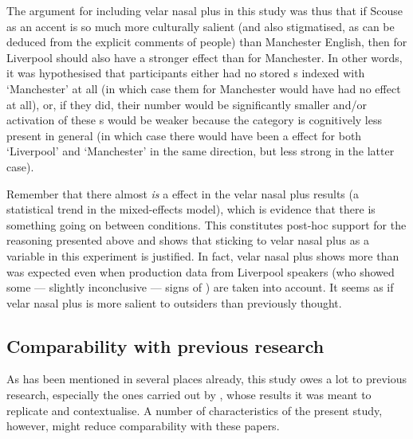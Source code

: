 The argument for including velar nasal plus in this study was thus that if Scouse as an accent is so much more culturally salient (and also stigmatised, as can be deduced from the explicit comments of people) than Manchester English, then  for Liverpool should also have a stronger effect than  for Manchester.
In other words, it was hypothesised that participants either had no stored s indexed with `Manchester' at all (in which case  them for Manchester would have had no effect at all), or, if they did, their number would be significantly smaller and/or activation of these s would be weaker because the category is cognitively less present in general (in which case there would have been a  effect for both `Liverpool' and `Manchester' in the same direction, but less strong in the latter case).

Remember that there almost \emph{is} a  effect in the velar nasal plus results (a statistical trend in the mixed-effects model), which is evidence that there is something going on between  conditions.
This constitutes post-hoc support for the reasoning presented above and shows that sticking to velar nasal plus as a variable in this experiment is justified.
In fact, velar nasal plus shows more  than was expected even when production data from Liverpool speakers (who showed some --- slightly inconclusive --- signs of ) are taken into account.
It seems as if velar nasal plus is more salient to outsiders than previously thought.

		\subsection{Comparability with previous research}

As has been mentioned in several places already, this study owes a lot to previous research, especially the ones carried out by \textcite{niedzielski1999,hayetal2006a,hayetal2006b,haydrager2010}, whose results it was meant to replicate and contextualise.
A number of characteristics of the present study, however, might reduce comparability with these papers.

